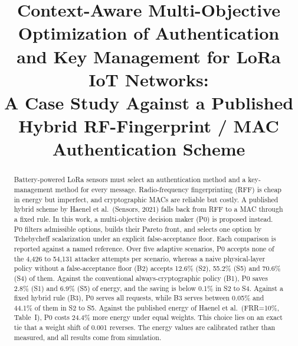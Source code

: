 \documentclass[conference]{IEEEtran}
\begin{document}
\title{Context-Aware Multi-Objective Optimization of Authentication and Key Management for LoRa IoT Networks:\\
A Case Study Against a Published Hybrid RF-Fingerprint / MAC Authentication Scheme}

\author{
\and
{}
\and
{}
}

\maketitle

\begin{abstract}
Battery-powered LoRa sensors must select an authentication method and a key-management method for every message. Radio-frequency fingerprinting (RFF) is cheap in energy but imperfect, and cryptographic MACs are reliable but costly. A published hybrid scheme by Haenel et al.\ (Sensors, 2021) falls back from RFF to a MAC through a fixed rule. In this work, a multi-objective decision maker (P0) is proposed instead. P0 filters admissible options, builds their Pareto front, and selects one option by Tchebycheff scalarization under an explicit false-acceptance floor. Each comparison is reported against a named reference. Over five adaptive scenarios, P0 accepts none of the 4{,}426 to 54{,}131 attacker attempts per scenario, whereas a naive physical-layer policy without a false-acceptance floor (B2) accepts 12.6\% (S2), 55.2\% (S5) and 70.6\% (S4) of them. Against the conventional always-cryptographic policy (B1), P0 saves 2.8\% (S1) and 6.9\% (S5) of energy, and the saving is below 0.1\% in S2 to S4. Against a fixed hybrid rule (B3), P0 serves all requests, while B3 serves between 0.05\% and 44.1\% of them in S2 to S5. Against the published energy of Haenel et al.\ (FRR=10\%, Table~I), P0 costs 24.4\% more energy under equal weights. This choice lies on an exact tie that a weight shift of 0.001 reverses. The energy values are calibrated rather than measured, and all results come from simulation.
\end{abstract}
\end{document}
